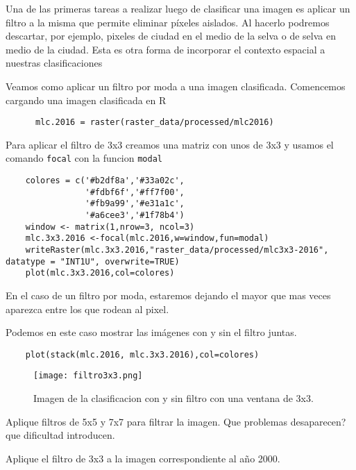 Una de las primeras tareas a realizar luego de clasificar una imagen es aplicar un filtro a la misma que permite eliminar p\'ixeles aislados. Al hacerlo podremos descartar, por ejemplo, pixeles de ciudad en el medio de la selva o de selva en medio de la ciudad. Esta es otra forma de incorporar el contexto espacial a nuestras clasificaciones
\begin{exa}
  Veamos como aplicar un filtro por moda a una imagen clasificada. Comencemos cargando una imagen clasificada en R

  \begin{lstlisting}
      mlc.2016 = raster(raster_data/processed/mlc2016)
  \end{lstlisting}

  Para aplicar el filtro de 3x3 creamos una matriz con unos de 3x3 y usamos
  el comando \texttt{focal} con la funcion \texttt{modal}

  \begin{lstlisting}
    colores = c('#b2df8a','#33a02c',
                '#fdbf6f','#ff7f00',
                '#fb9a99','#e31a1c',
                '#a6cee3','#1f78b4')
    window <- matrix(1,nrow=3, ncol=3)
    mlc.3x3.2016 <-focal(mlc.2016,w=window,fun=modal)
    writeRaster(mlc.3x3.2016,"raster_data/processed/mlc3x3-2016", datatype = "INT1U", overwrite=TRUE)
    plot(mlc.3x3.2016,col=colores)
  \end{lstlisting}
  En el caso de un filtro por moda, estaremos dejando el mayor que mas veces aparezca entre los que rodean al pixel.

  Podemos en este caso mostrar las im\'agenes con y sin el filtro juntas.

  \begin{lstlisting}
    plot(stack(mlc.2016, mlc.3x3.2016),col=colores)
  \end{lstlisting}
  \begin{figure}[h!]
    \centering
    \texttt{[image: filtro3x3.png]}
    \caption{Imagen de la clasificacion con y sin filtro con una ventana de 3x3.}
    \label{fig:3x3}
  \end{figure}
\end{exa}

\begin{act}
    Aplique filtros de 5x5 y 7x7 para filtrar la imagen. Que problemas desaparecen? que dificultad introducen.
\end{act}

\begin{act}
    Aplique el filtro de 3x3 a la imagen correspondiente al año 2000.
\end{act}

